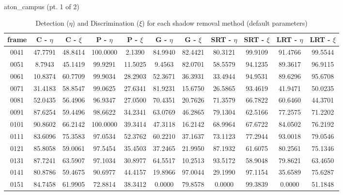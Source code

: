 \begin{appendices}
\begin{table}
\centering
\caption{aton\_campus (pt. 1 of 2)}
\caption*{Detection ($\eta$) and Discrimination ($\xi$) for each shadow removal method (default parameters)}
\begin{tabular}{ |c|c|c|c|c|c|c|c|c|c|c| }
	\hline
\textbf{frame} &  \textbf{C - $\eta$} &  \textbf{C - $\xi$} &  \textbf{P - $\eta$} &  \textbf{P - $\xi$} &  \textbf{G - $\eta$} &  \textbf{G - $\xi$} &  \textbf{SRT - $\eta$} &  \textbf{SRT - $\xi$} &  \textbf{LRT - $\eta$} &  \textbf{LRT - $\xi$} \\
\hline
\hline
0041 &  47.7791 &  48.8414 &   100.0000 &  2.1390 &   84.9940 &  82.4421 &   80.3121 &  99.9109 &   91.4766 &  99.5544    \\
\hline
0051 &  8.7943 &  45.1419 &   99.9291 &  11.5025 &   9.4563 &  82.0701 &   58.5579 &  94.1235 &   89.3617 &  96.9115    \\
\hline
0061 &  10.8374 &  60.7709 &   99.9034 &  28.2903 &   52.3671 &  36.3931 &   33.4944 &  94.9531 &   89.6296 &  95.6708    \\
\hline
0071 &  31.4183 &  58.8547 &   99.0625 &  27.6341 &   81.9231 &  15.6750 &   26.5865 &  93.4619 &   41.9471 &  50.0235    \\
\hline
0081 &  52.0435 &  56.4906 &   96.9347 &  27.0500 &   70.4351 &  20.7626 &   71.3579 &  66.7822 &   60.6460 &  44.3701    \\
\hline
0091 &  87.6254 &  59.4496 &   98.6622 &  34.2341 &   63.0769 &  46.2865 &   79.1304 &  62.5166 &   77.2575 &  71.2202    \\
\hline
0101 &  90.8602 &  66.2142 &   100.0000 &  39.3414 &   47.3118 &  16.2142 &   68.9964 &  67.6722 &   84.0502 &  76.2192    \\
\hline
0111 &  83.6096 &  75.3583 &   97.0534 &  52.3762 &   60.2210 &  37.1637 &   73.1123 &  77.2944 &   93.0018 &  79.0546    \\
\hline
0121 &  85.8058 &  59.0061 &   97.5454 &  35.4503 &   37.2465 &  21.9950 &   87.1932 &  61.6075 &   80.2561 &  75.1346    \\
\hline
0131 &  87.7241 &  63.5907 &   97.1034 &  30.8977 &   64.5517 &  10.2513 &   93.5172 &  58.9048 &   79.8621 &  63.4650    \\
\hline
0141 &  80.8786 &  59.4675 &   90.6977 &  44.4157 &   19.8966 &  97.0044 &   29.1990 &  97.1154 &   35.6589 &  75.6287   \\
\hline
0151 &  84.7458 &  61.9905 &   72.8814 &  38.3412 &   0.0000 &  79.8578 &   0.0000 &  99.3839 &   0.0000 &  51.1848   \\


\end{tabular}
\end{table}
\end{appendices}
